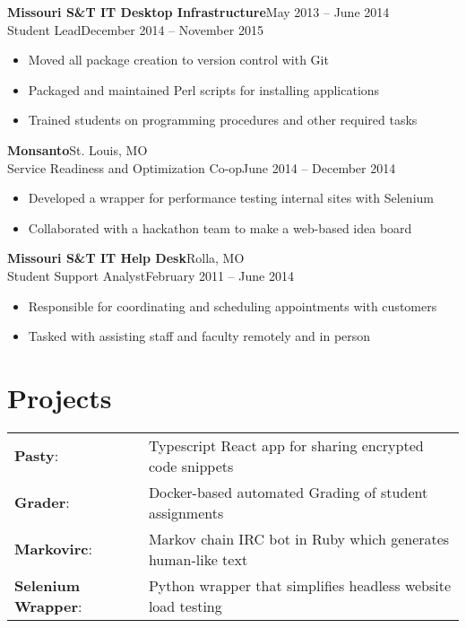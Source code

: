 \documentclass[margin]{res}
\newcommand{\github}[0]%
{%
  \hspace{-4mm}\faGithubSign\hspace{1mm}%
}
\begin{document}
\begin{resume}
       \textbf{Missouri S\&T IT Desktop Infrastructure}\hfill May 2013 -- June 2014\\
       Student Lead\hfill December 2014 -- November 2015
       \begin{itemize} \itemsep -1pt  %
         \item Moved all package creation to version control with Git
         \item Packaged and maintained Perl scripts for installing applications
         \item Trained students on programming procedures and other required tasks
       \end{itemize}

       \textbf{Monsanto}\hfill St. Louis, MO\\
       Service Readiness and Optimization Co-op\hfill June 2014 -- December 2014
       \begin{itemize} \itemsep -1pt  %
         \item Developed a wrapper for performance testing internal sites with Selenium
         \item Collaborated with a hackathon team to make a web-based idea board
       \end{itemize}

       \textbf{Missouri S\&T IT Help Desk}\hfill Rolla, MO\\
       Student Support Analyst\hfill February 2011 -- June 2014
       \begin{itemize} \itemsep -1pt  %
         \item Responsible for coordinating and scheduling appointments with customers
         \item Tasked with assisting staff and faculty remotely and in person
       \end{itemize}

    \section{Projects}
      \begin{tabular}{l p{4in}}
        \github\textbf{Pasty}:                & Typescript React app for sharing encrypted code snippets \\ [1pt]
        \github\textbf{Grader}:               & Docker-based automated Grading of student assignments \\ [1pt]
        \github\textbf{Markovirc}:            & Markov chain IRC bot in Ruby which generates human-like text \\ [1pt]
        \github\textbf{Selenium Wrapper}:     & Python wrapper that simplifies headless website load testing \\ [1pt]
      \end{tabular}


\end{resume}
\end{document}
